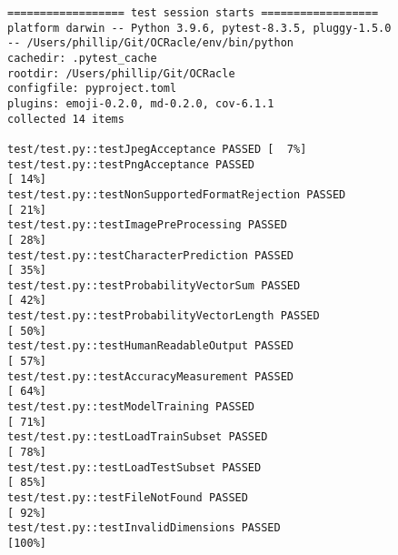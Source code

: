 \documentclass[12pt, titlepage]{article}
\begin{document}
\begin{verbatim}
================== test session starts ==================
platform darwin -- Python 3.9.6, pytest-8.3.5, pluggy-1.5.0
-- /Users/phillip/Git/OCRacle/env/bin/python
cachedir: .pytest_cache
rootdir: /Users/phillip/Git/OCRacle
configfile: pyproject.toml
plugins: emoji-0.2.0, md-0.2.0, cov-6.1.1
collected 14 items                                                                                                                                                                                

test/test.py::testJpegAcceptance PASSED [  7%]
test/test.py::testPngAcceptance PASSED                                                                                                                                                      [ 14%]
test/test.py::testNonSupportedFormatRejection PASSED                                                                                                                                        [ 21%]
test/test.py::testImagePreProcessing PASSED                                                                                                                                                 [ 28%]
test/test.py::testCharacterPrediction PASSED                                                                                                                                                [ 35%]
test/test.py::testProbabilityVectorSum PASSED                                                                                                                                               [ 42%]
test/test.py::testProbabilityVectorLength PASSED                                                                                                                                            [ 50%]
test/test.py::testHumanReadableOutput PASSED                                                                                                                                                [ 57%]
test/test.py::testAccuracyMeasurement PASSED                                                                                                                                                [ 64%]
test/test.py::testModelTraining PASSED                                                                                                                                                      [ 71%]
test/test.py::testLoadTrainSubset PASSED                                                                                                                                                    [ 78%]
test/test.py::testLoadTestSubset PASSED                                                                                                                                                     [ 85%]
test/test.py::testFileNotFound PASSED                                                                                                                                                       [ 92%]
test/test.py::testInvalidDimensions PASSED                                                                                                                                                  [100%]


\end{verbatim}
\end{document}
